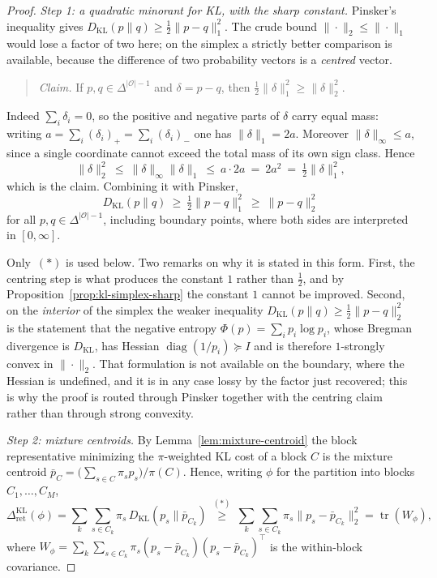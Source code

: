 \documentclass[12pt]{article}
\theoremstyle{definition}
\DeclareMathOperator{\tr}{tr}
\newcommand{\RetKL}{\Delta_{\mathrm{ret}}^{\mathrm{KL}}}
\begin{document}
\begin{proof}
\emph{Step 1: a quadratic minorant for KL, with the sharp constant.}
Pinsker's inequality gives
$D_{\mathrm{KL}}(p\|q)\ge\tfrac12\|p-q\|_1^2$.  The crude bound
$\|\cdot\|_2\le\|\cdot\|_1$ would lose a factor of two here; on the simplex a
strictly better comparison is available, because the difference of two
probability vectors is a \emph{centred} vector.

\begin{quote}
\emph{Claim.}  If $p,q\in\Delta^{|\mathcal O|-1}$ and $\delta=p-q$, then
$\tfrac12\|\delta\|_1^2\ge\|\delta\|_2^2$.
\end{quote}

\noindent
Indeed $\sum_i\delta_i=0$, so the positive and negative parts of $\delta$ carry
equal mass: writing
$a=\sum_i(\delta_i)_+=\sum_i(\delta_i)_-$ one has $\|\delta\|_1=2a$.  Moreover
$\|\delta\|_\infty\le a$, since a single coordinate cannot exceed the total
mass of its own sign class.  Hence
\[
\|\delta\|_2^2
\ \le\
\|\delta\|_\infty\|\delta\|_1
\ \le\
a\cdot 2a
\ =\
2a^2
\ =\
\tfrac12\|\delta\|_1^2 ,
\]
which is the claim.  Combining it with Pinsker,
\[
D_{\mathrm{KL}}(p\|q)\ \ge\ \tfrac12\|p-q\|_1^2\ \ge\ \|p-q\|_2^2
\tag{$*$}
\]
for all $p,q\in\Delta^{|\mathcal O|-1}$, including boundary points, where both
sides are interpreted in $[0,\infty]$.

Only~$(*)$ is used below.  Two remarks on why it is stated in this form.
First, the centring step is what produces the constant $1$ rather than
$\tfrac12$, and by Proposition~\ref{prop:kl-simplex-sharp} the constant $1$
cannot be improved.  Second, on the \emph{interior} of the simplex the weaker
inequality $D_{\mathrm{KL}}(p\|q)\ge\tfrac12\|p-q\|_2^2$ is the statement that
the negative entropy $\Phi(p)=\sum_ip_i\log p_i$, whose Bregman divergence is
$D_{\mathrm{KL}}$, has Hessian $\operatorname{diag}(1/p_i)\succeq I$ and is
therefore $1$-strongly convex in $\|\cdot\|_2$.  That formulation is not
available on the boundary, where the Hessian is undefined, and it is in any
case lossy by the factor just recovered; this is why the proof is routed
through Pinsker together with the centring claim rather than through strong
convexity.

\emph{Step 2: mixture centroids.}
By Lemma~\ref{lem:mixture-centroid} the block representative minimizing the
$\pi$-weighted KL cost of a block $C$ is the mixture centroid
$\bar p_C=\bigl(\sum_{s\in C}\pi_sp_s\bigr)/\pi(C)$.  Hence, writing $\phi$ for
the partition into blocks $C_1,\dots,C_M$,
\[
\RetKL(\phi)
=
\sum_{k}\sum_{s\in C_k}\pi_s\,D_{\mathrm{KL}}(p_s\|\bar p_{C_k})
\ \overset{(*)}{\ge}\
\sum_k\sum_{s\in C_k}\pi_s\|p_s-\bar p_{C_k}\|_2^2
=
\tr(W_\phi),
\]
where $W_\phi=\sum_k\sum_{s\in C_k}\pi_s(p_s-\bar p_{C_k})(p_s-\bar p_{C_k})^{\!\top}$
is the within-block covariance.


\end{proof}
\end{document}
